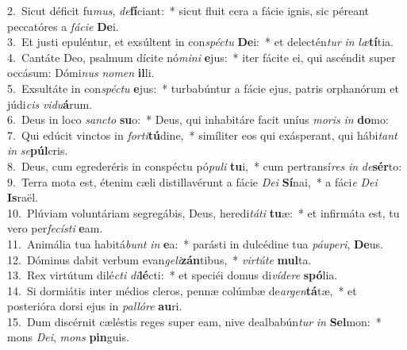 {2.~}Sicut déficit fu\textit{mus}, \textit{de}\textbf{fí}ciant:~* sicut fluit cera a fácie ignis, sic péreant peccatóres a \textit{fá}\textit{ci}\textit{e} \textbf{De}i.\\
{3.~}Et justi epuléntur, et exsúltent in con\textit{spé}\textit{ctu} \textbf{De}i:~* et delectén\textit{tur} \textit{in} \textit{læ}\textbf{tí}tia.\\
{4.~}Cantáte Deo, psalmum dícite nó\textit{mi}\textit{ni} \textbf{e}jus:~* iter fácite ei, qui ascéndit super occásum: Dómi\textit{nus} \textit{no}\textit{men} \textbf{il}li.\\
{5.~}Exsultáte in con\textit{spé}\textit{ctu} \textbf{e}jus:~* turbabúntur a fácie ejus, patris orphanórum et júdi\textit{cis} \textit{vi}\textit{du}\textbf{á}rum.\\
{6.~}Deus in loco \textit{san}\textit{cto} \textbf{su}o:~* Deus, qui inhabitáre facit uníus \textit{mo}\textit{ris} \textit{in} \textbf{do}mo:\\
{7.~}Qui edúcit vinctos in \textit{for}\textit{ti}\textbf{tú}dine,~* simíliter eos qui exásperant, qui hábi\textit{tant} \textit{in} \textit{se}\textbf{púl}cris.\\
{8.~}Deus, cum egrederéris in conspéctu pó\textit{pu}\textit{li} \textbf{tu}i,~* cum pertransí\textit{res} \textit{in} \textit{de}\textbf{sér}to:\\
{9.~}Terra mota est, étenim cæli distillavérunt a fácie \textit{De}\textit{i} \textbf{Sí}nai,~* a fáci\textit{e} \textit{De}\textit{i} \textbf{Is}raël.\\
{10.~}Plúviam voluntáriam segregábis, Deus, heredi\textit{tá}\textit{ti} \textbf{tu}æ:~* et infirmáta est, tu vero per\textit{fe}\textit{cí}\textit{sti} \textbf{e}am.\\
{11.~}Animália tua habitá\textit{bunt} \textit{in} \textbf{e}a:~* parásti in dulcédine tua \textit{páu}\textit{pe}\textit{ri}, \textbf{De}us.\\
{12.~}Dóminus dabit verbum evan\textit{ge}\textit{li}\textbf{zán}tibus,~* \textit{vir}\textit{tú}\textit{te} \textbf{mul}ta.\\
{13.~}Rex virtútum dilé\textit{cti} \textit{di}\textbf{lé}cti:~* et speciéi domus di\textit{ví}\textit{de}\textit{re} \textbf{spó}lia.\\
{14.~}Si dormiátis inter médios cleros, pennæ colúmbæ de\textit{ar}\textit{gen}\textbf{tá}tæ,~* et posterióra dorsi ejus in \textit{pal}\textit{ló}\textit{re} \textbf{au}ri.\\
{15.~}Dum discérnit cæléstis reges super eam, nive dealbabún\textit{tur} \textit{in} \textbf{Sel}mon:~* mons \textit{De}\textit{i}, \textit{mons} \textbf{pin}guis.\\
